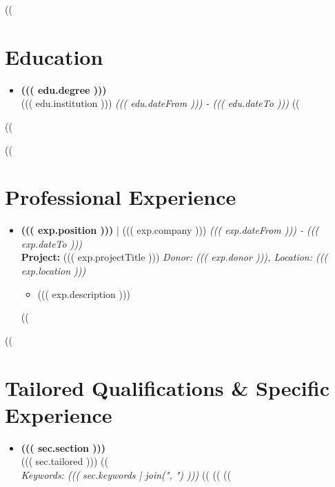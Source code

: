 \documentclass[10pt,a4paper]{article}
\begin{document}
((%
\section*{Education}
\begin{itemize}[leftmargin=*]
((%
    \item[] \textbf{((( edu.degree )))} \\
    ((( edu.institution ))) \hfill \textit{((( edu.dateFrom ))) - ((( edu.dateTo )))}
((%
\end{itemize}
\vspace{0.2cm}
((%

((%
\section*{Professional Experience}
\begin{itemize}[leftmargin=*]
((%
    \item[] \textbf{((( exp.position )))} | ((( exp.company ))) \hfill \textit{((( exp.dateFrom ))) - ((( exp.dateTo )))} \\
    \textbf{Project:} ((( exp.projectTitle ))) \hfill \textit{Donor: ((( exp.donor ))), Location: ((( exp.location )))} \\
    \vspace{-0.15cm}
    \begin{itemize}[label=$\bullet$, leftmargin=1.5em]
        \item ((( exp.description )))
    \end{itemize}
    \vspace{0.2cm}
((%
\end{itemize}
\vspace{0.2cm}
((%

\section*{Tailored Qualifications \& Specific Experience}
\begin{itemize}[leftmargin=*]
((%
    ((%
        \item[] \textbf{((( sec.section )))} \\
        ((( sec.tailored )))
        ((%
            \\ \textit{Keywords: ((( sec.keywords | join(", ") )))}
        ((%
        \vspace{0.2cm}
    ((%
((%
\end{itemize}
\vspace{0.2cm}
\end{document}
